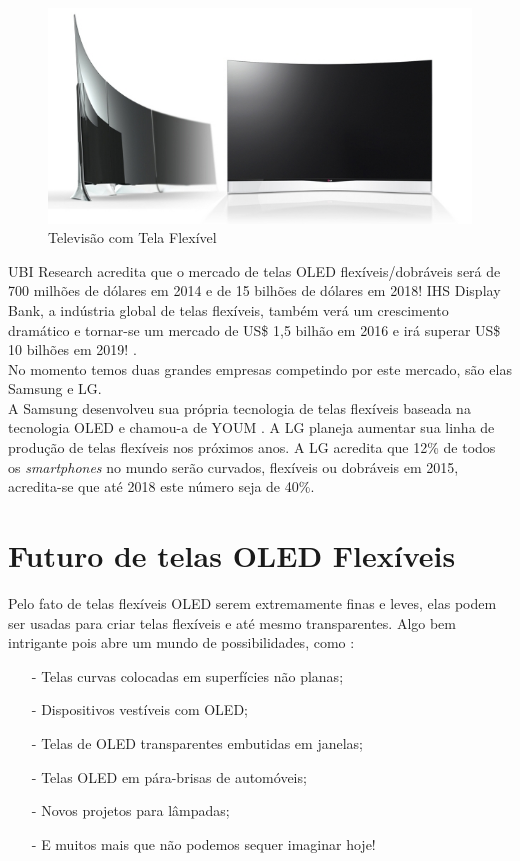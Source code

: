 \begin{figure}[!ht]
  \centering
  \includegraphics[width=.70\textwidth]{./figuras/flexible-tv} 
  \caption{Televisão com Tela Flexível}
  \label{fig:flexible-tv} 
\end{figure}

UBI Research acredita que o mercado de telas OLED flexíveis/dobráveis será de 700 milhões de dólares em 2014 e de 15 bilhões de dólares em 2018! IHS Display Bank, a indústria global de telas flexíveis, também verá um crescimento dramático e tornar-se um mercado de US\$ 1,5 bilhão em 2016 e irá superar US\$ 10 bilhões em 2019! \cite{NOLEDDN}.\\

No momento temos duas grandes empresas competindo por este mercado, são elas Samsung e LG.\\

A Samsung desenvolveu sua própria tecnologia de telas flexíveis baseada na tecnologia OLED e chamou-a de YOUM \cite{SYOUM}. A LG planeja aumentar sua linha de produção de telas flexíveis nos próximos anos. A LG acredita que 12\% de todos os \textit{smartphones} no mundo serão curvados, flexíveis ou dobráveis em 2015, acredita-se que até 2018 este número seja de 40\%.\\


\section{Futuro de telas OLED Flexíveis}
\label{sec:futuro}

Pelo fato de telas flexíveis OLED serem extremamente finas e leves, elas podem ser usadas para criar telas flexíveis e até mesmo transparentes. Algo bem intrigante pois abre um mundo de possibilidades, como \cite{OIBOI}: 

\begin{enumerate}
    \item[-] Telas curvas colocadas em superfícies não planas;
    \item[-] Dispositivos vestíveis com OLED;
    \item[-] Telas de OLED transparentes embutidas em janelas;
    \item[-] Telas OLED em pára-brisas de automóveis;
    \item[-] Novos projetos para lâmpadas;
    \item[-] E muitos mais que não podemos sequer imaginar hoje!
\end{enumerate}

